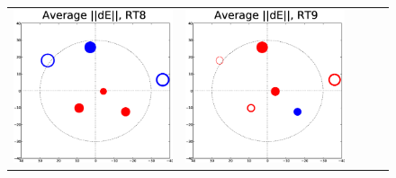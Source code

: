 \documentclass[]{aa}
\begin{document}
\begin{figure}
\begin{tabular}{@{}c@{}c@{}c@{}c@{}c@{}}
\includegraphics[width=\roguewidth]{o2003_dE_ant8} &
\includegraphics[width=\roguewidth]{o2003_dE_ant9} \\

\end{tabular}
\end{figure}
\end{document}
